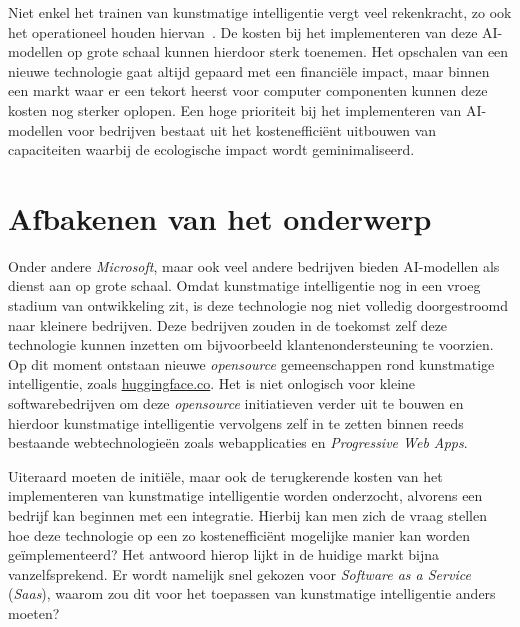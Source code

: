 \bigbreak{}

Niet enkel het trainen van kunstmatige intelligentie vergt veel rekenkracht, zo ook het operationeel houden hiervan~\autocite{Patel2023}. De kosten bij het implementeren van deze AI-modellen op grote schaal kunnen hierdoor sterk toenemen. Het opschalen van een nieuwe technologie gaat altijd gepaard met een financiële impact, maar binnen een markt waar er een tekort heerst voor computer componenten  kunnen deze kosten nog sterker oplopen. Een hoge prioriteit bij het implementeren van AI-modellen voor bedrijven bestaat uit het kostenefficiënt uitbouwen van capaciteiten waarbij de ecologische impact wordt geminimaliseerd.

\bigbreak{}

\section{Afbakenen van het onderwerp}

Onder andere \textit{Microsoft}, maar ook veel andere bedrijven bieden  AI-modellen als dienst aan op grote schaal. Omdat kunstmatige intelligentie nog in een vroeg stadium van ontwikkeling zit, is deze technologie nog niet volledig doorgestroomd naar kleinere bedrijven. Deze bedrijven zouden in de toekomst zelf deze technologie kunnen inzetten om bijvoorbeeld klan\-ten\-on\-der\-steu\-ning te voorzien. Op dit moment ontstaan nieuwe \textit{opensource} gemeenschappen rond kunstmatige intelligentie, zoals \href{https://huggingface.co/}{huggingface.co}. Het is niet onlogisch voor kleine softwarebedrijven om deze \textit{opensource} initiatieven verder uit te bouwen en hierdoor kunstmatige intelligentie vervolgens zelf in te zetten binnen reeds bestaande webtechnologieën zoals web\-app\-li\-ca\-ties en \textit{Progressive Web Apps}.

\bigbreak{}

Uiteraard moeten de initiële, maar ook de terugkerende kosten van het implementeren van kunstmatige intelligentie worden onderzocht, alvorens een bedrijf kan beginnen met een integratie. Hierbij kan men zich de vraag stellen hoe deze technologie op een zo kostenefficiënt mogelijke manier kan worden geïmplementeerd? Het antwoord hierop lijkt in de huidige markt bijna vanzelfsprekend. Er wordt namelijk snel gekozen voor \textit{Software as a Service} (\textit{Saas}), waarom zou dit voor het toepassen van kunstmatige intelligentie anders moeten?

\section{}%
\label{sec:probleemstelling}

